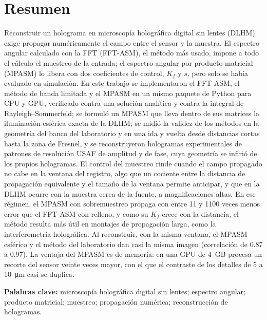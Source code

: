 \chapter*{Resumen}

Reconstruir un holograma en microscopía holográfica digital sin lentes (DLHM)
exige propagar numéricamente el campo entre el sensor y la muestra. El
espectro angular calculado con la FFT (FFT-ASM), el método más usado, impone a
todo el cálculo el muestreo de la entrada; el espectro angular por producto
matricial
(MPASM) lo libera con dos coeficientes de control, $K_f$ y $s$, pero solo se
había evaluado en simulación. En este trabajo se implementaron el FFT-ASM, el
método de banda limitada y el MPASM en un mismo paquete de Python para CPU y
GPU, verificado contra una solución analítica y contra la integral de
Rayleigh--Sommerfeld; se formuló un MPASM que lleva dentro de sus matrices la
iluminación esférica exacta de la DLHM; se midió la validez de los métodos en
la geometría del banco del laboratorio y en una ida y vuelta desde distancias
cortas hasta la zona de Fresnel, y se reconstruyeron hologramas experimentales
de patrones de resolución USAF de amplitud y de fase, cuya geometría se infirió de los
propios hologramas. El control del muestreo rinde cuando el campo
propagado no cabe en la ventana del registro, algo que un cociente entre la
distancia de propagación equivalente y el tamaño de la ventana permite
anticipar, y que en la DLHM ocurre con la muestra cerca de la fuente, a
magnificaciones altas. En
ese régimen, el MPASM con sobremuestreo propaga con entre 11 y 1100 veces
menos error que el FFT-ASM con relleno, y como su $K_f$ crece con la
distancia, el método resulta más útil en montajes de propagación larga, como
la interferometría holográfica. Al reconstruir, con la misma ventana,
el MPASM esférico y el método del laboratorio dan casi la misma imagen
(correlación de 0.87 a 0.97). La ventaja del MPASM es de memoria: en una GPU
de \SI{4}{GB} procesa un recorte del sensor veinte veces mayor, con el que el
contraste de los detalles de 5 a \SI{10}{\micro\metre} casi se duplica.

\vspace{0.5cm}
\noindent\textbf{Palabras clave:} microscopía holográfica digital sin lentes;
espectro angular; producto matricial; muestreo; propagación numérica;
reconstrucción de hologramas.

